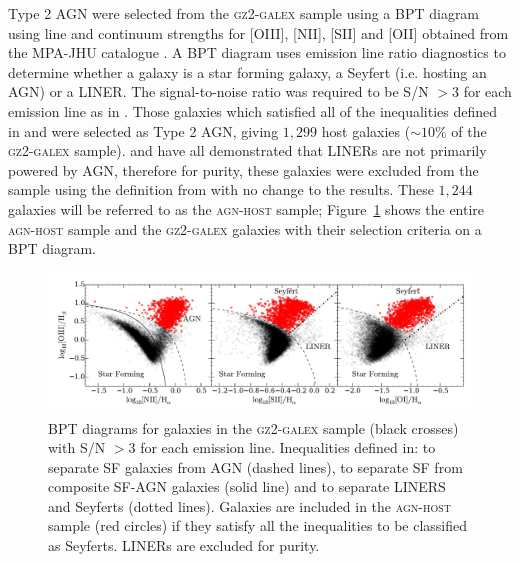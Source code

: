 Type 2 AGN were selected from the \textsc{gz2-galex} sample using a BPT diagram \citep{bpt} using line and continuum strengths for [OIII], [NII], [SII] and [OII] obtained from the MPA-JHU catalogue \citep{kauffmann03, brinchmann04}. A BPT diagram uses emission line ratio diagnostics to determine whether a galaxy is a star forming galaxy, a Seyfert (i.e. hosting an AGN) or a LINER. The signal-to-noise ratio was required to be S/N $> 3$ for each emission line as in \cite{schawinski10a}. Those galaxies which satisfied all of the inequalities defined in \cite[][to separate SF galaxies from AGN]{kewley01} and \cite[][to separate SF galaxies from composite SF-AGN galaxies]{kauffmann03b} were selected as Type 2 AGN, giving $1,299$ host galaxies ($\sim10\%$ of the \textsc{gz2-galex} sample). \cite{Sarzi10, yan12} and \cite{Singh13} have all demonstrated that LINERs are not primarily powered by AGN, therefore for purity, these galaxies were excluded from the sample using the definition from \cite[][$55$ galaxies total]{kewley06} with no change to the results. These $1,244$ galaxies will be referred to as the \textsc{agn-host} sample; Figure~\ref{bpt} shows the entire \textsc{agn-host} sample and the \textsc{gz2-galex} galaxies with their selection criteria on a BPT diagram.

\begin{figure}
\includegraphics[width=\textwidth]{agn/fig2.pdf}
\caption[BPT diagram used to select AGN host galaxies]{BPT diagrams for galaxies in the \textsc{gz2-galex} sample (black crosses) with S/N $> 3$ for each emission line. Inequalities defined in: \protect\cite{kewley01} to separate SF galaxies from AGN (dashed lines), \protect\cite{kauffmann03b} to separate SF from composite SF-AGN galaxies (solid line) and \protect\cite{kewley06} to separate LINERS and Seyferts (dotted lines). Galaxies are included in the \textsc{agn-host} sample (red circles) if they satisfy all the inequalities to be classified as Seyferts. LINERs are excluded for purity.}
\label{bpt}
\end{figure}

